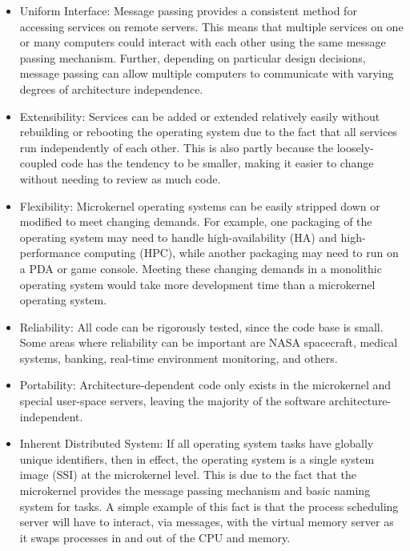 \begin{itemize} %

\item {\important Uniform Interface}:
Message passing provides a consistent method for accessing services
on remote servers.  This means that multiple services on one or many
computers could interact with each other using the same message
passing mechanism.  Further, depending on particular
design decisions, message passing can allow multiple computers
to communicate with varying degrees of architecture
independence.

\item {\important Extensibility}: Services can be added or extended
relatively easily without rebuilding or rebooting the operating system
due to the fact that all services run independently of each
other.  This is also partly because the
loosely-coupled code has the tendency to be smaller, making it easier to
change without needing to review as much code.

\item {\important Flexibility}: Microkernel operating systems can be easily
stripped down or modified to meet changing demands.
For example, one packaging of the operating system may need to handle
high-availability (HA) and high-performance computing (HPC), while another
packaging may need to run on a PDA or game console.  Meeting these changing
demands in a monolithic operating system would take more development time
than a microkernel operating system.

\item {\important Reliability}: All code can be rigorously tested, since
the code base is small.  Some areas where reliability
can be important are NASA spacecraft, medical systems, banking,
real-time environment monitoring, and others.

\item {\important Portability}: Architecture-dependent code only
exists in the microkernel and special user-space servers, leaving
the majority of the software architecture-independent.

\item {\important Inherent Distributed System}: If all operating
system tasks have globally unique identifiers, then in effect, the
operating system is a single system image (SSI) at the
microkernel level.  This is due to the fact that
the microkernel provides the message passing mechanism and basic
naming system for tasks.  A
simple example of this fact is that the process scheduling server will have
to interact, via messages, with the virtual memory server as it swaps
processes in and out of the CPU and memory.


\end{itemize}
